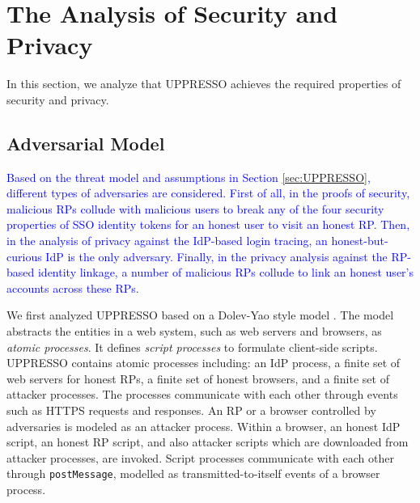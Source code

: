 \section{The Analysis of Security and Privacy}
\label{sec:analysis}
In this section, we analyze that UPPRESSO achieves the required properties of security and privacy.

\subsection{Adversarial Model}
\label{adver-model}
\textcolor{blue}{Based on the threat model and assumptions in Section \ref{sec:UPPRESSO},
    different types of adversaries are considered.
First of all, in the proofs of security,
    malicious RPs collude with malicious users
        to break any of the four security properties of SSO identity tokens for an honest user to visit an honest RP.
Then, in the analysis of privacy against the IdP-based login tracing,
   an honest-but-curious IdP is the only adversary.
Finally,
    in the privacy analysis against the RP-based identity linkage,
    a number of malicious RPs collude to link an honest user's accounts across these RPs.}

We first analyzed UPPRESSO %
     based on a Dolev-Yao style model \cite{SPRESSO}.
The model abstracts the entities in a web system,
    such as web servers and browsers,
    as \emph{atomic processes}. %
It defines \emph{script processes} to formulate client-side scripts.
%
%
%
%
UPPRESSO contains atomic processes including:
an IdP process,
    a finite set of web servers for honest RPs, a finite set of honest browsers, and a finite set of attacker processes.
The processes communicate with each other through events such as HTTPS requests and responses.
An RP or a browser controlled by adversaries is modeled as an attacker process.
Within a browser,
 an honest IdP script, an honest RP script, and also attacker scripts which are downloaded from attacker processes,
  are invoked.
Script processes communicate with each other through \verb+postMessage+,
    modelled as transmitted-to-itself events of a browser process.


